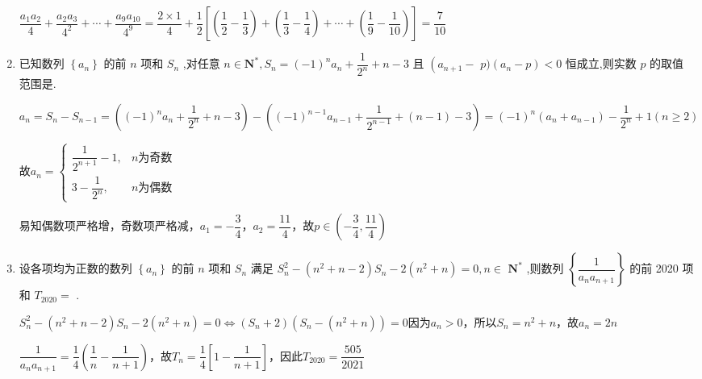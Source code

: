 \begin{enumerate}
\begin{jieda}
        $\dfrac{{a}_{1}{a}_{2}}{4} + \dfrac{{a}_{2}{a}_{3}}{{4}^{2}} + \cdots  + \dfrac{{a}_{9}{a}_{10}}{{4}^{9}} = \dfrac{2\times 1}{4} + \dfrac{1}{2}\left[\left(\dfrac{1}{2} - \dfrac{1}{3}\right)+\left(\dfrac{1}{3} - \dfrac{1}{4}\right)+\cdots+\left(\dfrac{1}{9} - \dfrac{1}{10}\right)\right] = \dfrac{7}{10}$
    \end{jieda}
    \item 已知数列 $\left\{  {a}_{n}\right\}$ 的前 $n$ 项和 ${S}_{n}$ ,对任意 $n \in  {\mathbf{N}}^{ * },{S}_{n} = {\left( -1\right) }^{n}{a}_{n} + \dfrac{1}{{2}^{n}} + n - 3$ 且 $\left( {a}_{n + 1}\right.  -$  $p)\left( {{a}_{n} - p}\right)  < 0$ 恒成立,则实数 $p$ 的取值范围是.
    \begin{jieda}
        $a_n = S_n - S_{n-1} = \left({\left( -1\right) }^{n}{a}_{n} + \dfrac{1}{{2}^{n}} + n - 3\right) - \left({\left( -1\right) }^{n-1}{a}_{n-1} + \dfrac{1}{{2}^{n-1}} + (n-1) - 3\right) = (-1)^n(a_n+a_{n-1})-\dfrac{1}{2^n}+1 (n \geq 2)$
        故$a_n = \left\{\begin{array}{ll}
             \dfrac{1}{2^{n+1}} - 1, & n\text{为奇数}\\
             3 - \dfrac{1}{2^n}, & n\text{为偶数}
        \end{array}\right.$
        
        易知偶数项严格增，奇数项严格减，$a_1 = -\dfrac{3}{4}$，$a_2 = \dfrac{11}{4}$，故$p \in \left(-\dfrac{3}{4}, \dfrac{11}{4}\right)$
    \end{jieda}
    \item 设各项均为正数的数列 $\left\{  {a}_{n}\right\}$ 的前 $n$ 项和 ${S}_{n}$ 满足 ${S}_{n}^{2} - \left( {{n}^{2} + n - 2}\right) {S}_{n} - 2\left( {{n}^{2} + n}\right)  = 0,n \in$  ${\mathbf{N}}^{ * }$ ,则数列 $\left\{  \dfrac{1}{{a}_{n}{a}_{n + 1}}\right\}$ 的前 2020 项和 ${T}_{2020} =$ .
    \begin{jieda}
        ${S}_{n}^{2} - \left( {{n}^{2} + n - 2}\right) {S}_{n} - 2\left( {{n}^{2} + n}\right)  = 0 \Longleftrightarrow (S_n + 2)(S_n - (n^2+n)) = 0$因为${a}_{n} > 0$，所以$S_n = n^2+n$，故$a_n = 2n$

        $\dfrac{1}{a_na_{n+1}} = \dfrac{1}{4}\left(\dfrac{1}{n} - \dfrac{1}{n+1}\right)$，故$T_n = \dfrac{1}{4}\left[1 - \dfrac{1}{n+1}\right]$，因此$T_{2020} = \dfrac{505}{2021}$
    \end{jieda}
\end{enumerate}

